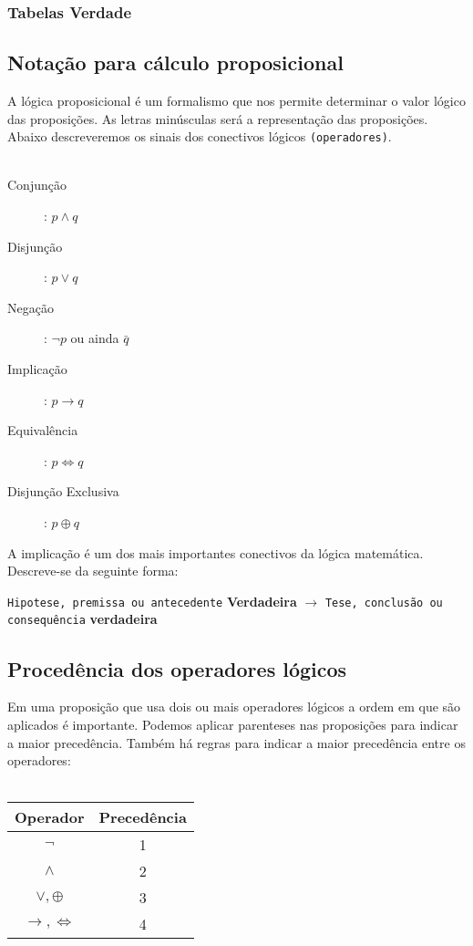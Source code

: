 \documentclass[12pt, onecolumn]{article}
\begin{document}
		\subsubsection{\centering Tabelas Verdade}

		\subsection{\cetering Notação para cálculo proposicional}

	A lógica proposicional é um formalismo que nos permite determinar o valor 
	lógico das proposições. As letras minúsculas será a representação das 
	proposições. Abaixo descreveremos os sinais dos conectivos lógicos 
	\texttt{(operadores)}.\\
	\\
		\begin{description}
			\item[Conjunção]: $p \land q$
			\item[Disjunção]: $p \lor q$
			\item[Negação]: $\lnot p$ ou ainda $\bar{q}$
			\item[Implicação]: $p \longrightarrow q$
			\item[Equivalência]: $p \Longleftrightarrow q$
			\item[Disjunção Exclusiva]: $p \oplus q$
		\end{description}

	A implicação é um dos mais importantes conectivos da lógica matemática. 
	Descreve-se da seguinte forma: 

		\begin{center}
			\texttt{Hipotese, premissa ou antecedente} 
			\textbf{Verdadeira} 
			$\longrightarrow$
			\texttt{Tese, conclusão ou consequência} 
			\textbf{verdadeira}
		\end{center}
		
	\subsection{\centering Procedência dos operadores lógicos}

	Em uma proposição que usa dois ou mais operadores lógicos a ordem em que são
	aplicados é importante. Podemos aplicar parenteses nas proposições para indicar
	a maior precedência. Também há regras para indicar a maior precedência entre
	os operadores: \\
	\\
		\begin{table}[h]
		\centering
			\begin{tabular}{|c|c|}
				\hline
				Operador & Precedência\\ \hline

				$\lnot$ & 1 \\
				$\land$ & 2 \\
				$\lor, \oplus$ & 3 \\
				$\longrightarrow, \Longleftrightarrow$ & 4 \\
				\hline
			\end{tabular}
		\end{table}
\end{document}
